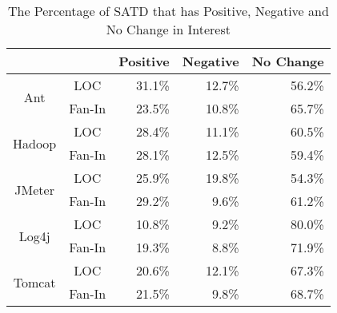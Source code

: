 \begin{table}[tb]
  \caption{The Percentage of SATD that has Positive, Negative and No Change in Interest }
  \label{tab:percentage}
  \centering

  \begin{tabular}{cc|rrr}
  \hline
        & & \textbf{Positive} & \textbf{Negative} & \textbf{No Change} \\
  \hline
\multirow{2}{*}{Ant} &  LOC  &  31.1\%  &  12.7\% & 56.2\%\\
                   & Fan-In  &  23.5\%  &  10.8\% & 65.7\%\\
  \hline
\multirow{2}{*}{Hadoop} &  LOC  &  28.4\%  &  11.1\% & 60.5\%\\
                      & Fan-In  &  28.1\%  &  12.5\% & 59.4\%\\
  \hline
\multirow{2}{*}{JMeter} &  LOC  &  25.9\%  &  19.8\% & 54.3\%\\
                      & Fan-In  &  29.2\%  &  9.6\% & 61.2\%\\
  \hline
\multirow{2}{*}{Log4j} &  LOC  &  10.8\%  &  9.2\% & 80.0\%\\
                     & Fan-In  &  19.3\%  &  8.8\% & 71.9\%\\
  \hline
\multirow{2}{*}{Tomcat} &  LOC &  20.6\%  &  12.1\% & 67.3\%\\
                      & Fan-In &  21.5\%  &  9.8\% & 68.7\%\\
  \hline
  \end{tabular}
\end{table}
